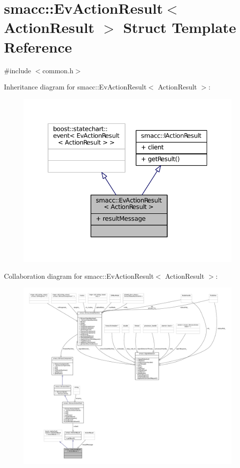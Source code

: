 \hypertarget{structsmacc_1_1EvActionResult}{}\section{smacc\+:\+:Ev\+Action\+Result$<$ Action\+Result $>$ Struct Template Reference}
\label{structsmacc_1_1EvActionResult}


{\ttfamily \#include $<$common.\+h$>$}



Inheritance diagram for smacc\+:\+:Ev\+Action\+Result$<$ Action\+Result $>$\+:
\nopagebreak
\begin{figure}[H]
\begin{center}
\leavevmode
\includegraphics[width=338pt]{structsmacc_1_1EvActionResult__inherit__graph}
\end{center}
\end{figure}


Collaboration diagram for smacc\+:\+:Ev\+Action\+Result$<$ Action\+Result $>$\+:
\nopagebreak
\begin{figure}[H]
\begin{center}
\leavevmode
\includegraphics[width=350pt]{structsmacc_1_1EvActionResult__coll__graph}
\end{center}
\end{figure}
